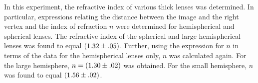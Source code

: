 
\physics

\begin{paperabs}
	
	In this experiment, the refractive index of various thick lenses was determined. In particular, expressions relating the distance between the image and the right vertex and the index of refraction \( n \) were determined for hemispherical and spherical lenses. The refractive index of the spherical and large hemispherical lenses was found to equal \( \left(1.32 \pm .05\right) \). Further, using the expression for \( n \) in terms of the data for the hemispherical lenses only, \( n \) was calculated again. For the large hemisphere, \( n = \left(1.30 \pm .02\right) \) was obtained. For the small hemisphere, \( n \) was found to equal \( \left(1.56 \pm .02\right) \).
	
\end{paperabs}

